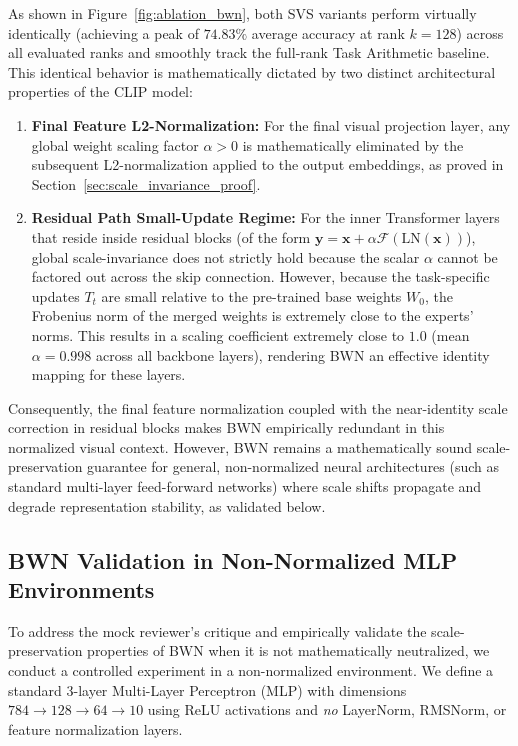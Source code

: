 As shown in Figure~\ref{fig:ablation_bwn}, both SVS variants perform virtually identically (achieving a peak of $74.83\%$ average accuracy at rank $k=128$) across all evaluated ranks and smoothly track the full-rank Task Arithmetic baseline. This identical behavior is mathematically dictated by two distinct architectural properties of the CLIP model:
\begin{enumerate}
    \item \textbf{Final Feature L2-Normalization:} For the final visual projection layer, any global weight scaling factor $\alpha > 0$ is mathematically eliminated by the subsequent L2-normalization applied to the output embeddings, as proved in Section~\ref{sec:scale_invariance_proof}.
    \item \textbf{Residual Path Small-Update Regime:} For the inner Transformer layers that reside inside residual blocks (of the form $\mathbf{y} = \mathbf{x} + \alpha \mathcal{F}(\text{LN}(\mathbf{x}))$), global scale-invariance does not strictly hold because the scalar $\alpha$ cannot be factored out across the skip connection. However, because the task-specific updates $T_t$ are small relative to the pre-trained base weights $W_0$, the Frobenius norm of the merged weights is extremely close to the experts' norms. This results in a scaling coefficient extremely close to $1.0$ (mean $\alpha = 0.998$ across all backbone layers), rendering BWN an effective identity mapping for these layers.
\end{enumerate}
Consequently, the final feature normalization coupled with the near-identity scale correction in residual blocks makes BWN empirically redundant in this normalized visual context. However, BWN remains a mathematically sound scale-preservation guarantee for general, non-normalized neural architectures (such as standard multi-layer feed-forward networks) where scale shifts propagate and degrade representation stability, as validated below.

\subsection{BWN Validation in Non-Normalized MLP Environments}
\label{sec:mlp_bwn_validation}

To address the mock reviewer's critique and empirically validate the scale-preservation properties of BWN when it is not mathematically neutralized, we conduct a controlled experiment in a non-normalized environment. We define a standard 3-layer Multi-Layer Perceptron (MLP) with dimensions $784 \rightarrow 128 \rightarrow 64 \rightarrow 10$ using ReLU activations and \emph{no} LayerNorm, RMSNorm, or feature normalization layers. 

